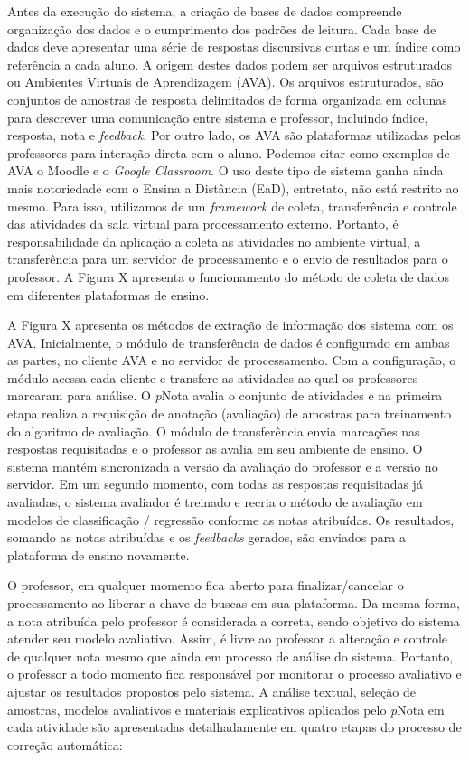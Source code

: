 Antes da execução do sistema, a criação de bases de dados compreende organização dos dados e o cumprimento dos padrões de leitura. Cada base de dados deve apresentar uma série de respostas discursivas curtas e um índice como referência a cada aluno. A origem destes dados podem ser arquivos estruturados ou Ambientes Virtuais de Aprendizagem (AVA). Os arquivos estruturados, são conjuntos de amostras de resposta delimitados de forma organizada em colunas para descrever uma comunicação entre sistema e professor, incluindo índice, resposta, nota e \textit{feedback}. Por outro lado, os AVA são plataformas utilizadas pelos professores para interação direta com o aluno. Podemos citar como exemplos de AVA o Moodle e o \textit{Google Classroom}. O uso deste tipo de sistema ganha ainda mais notoriedade com o Ensina a Distância (EaD), entretato, não está restrito ao mesmo. Para isso, utilizamos de um \textit{framework} de coleta, transferência e controle das atividades da sala virtual para processamento externo. Portanto, é responsabilidade da aplicação a coleta as atividades no ambiente virtual, a transferência para um servidor de processamento e o envio de resultados para o professor. A Figura X apresenta o funcionamento do método de coleta de dados em diferentes plataformas de ensino.


A Figura X apresenta os métodos de extração de informação dos sistema com os AVA. Inicialmente, o módulo de transferência de dados é configurado em ambas as partes, no cliente AVA e no servidor de processamento. Com a configuração, o módulo acessa cada cliente e transfere as atividades ao qual os professores marcaram para análise. O \textit{p}Nota avalia o conjunto de atividades e na primeira etapa realiza a requisição de anotação (avaliação) de amostras para treinamento do algoritmo de avaliação. O módulo de transferência envia marcações nas respostas requisitadas e o professor as avalia em seu ambiente de ensino. O sistema mantém sincronizada a versão da avaliação do professor e a versão no servidor. Em um segundo momento, com todas as respostas requisitadas já avaliadas, o sistema avaliador é treinado e recria o método de avaliação em modelos de classificação / regressão conforme as notas atribuídas. Os resultados, somando as notas atribuídas e os \textit{feedbacks} gerados, são enviados para a plataforma de ensino novamente.

O professor, em qualquer momento fica aberto para finalizar/cancelar o processamento ao liberar a chave de buscas em sua plataforma. Da mesma forma, a nota atribuída pelo professor é considerada a correta, sendo objetivo do sistema atender seu modelo avaliativo. Assim, é livre ao professor a alteração e controle de qualquer nota mesmo que ainda em processo de análise do sistema. Portanto, o professor a todo momento fica responsável por monitorar o processo avaliativo e ajustar os resultados propostos pelo sistema. A análise textual, seleção de amostras, modelos avaliativos e materiais explicativos aplicados pelo \textit{p}Nota em cada atividade são apresentadas detalhadamente em quatro etapas do processo de correção automática:

